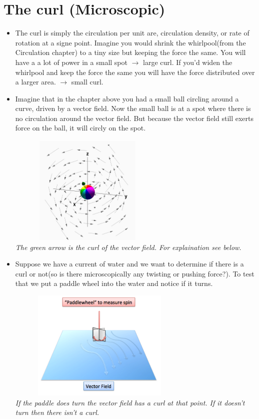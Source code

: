 \documentclass[12pt,a4paper]{article}
\begin{document}
	\newpage
	
	\section{The curl (Microscopic)}
	\begin{itemize}
		
		\item The curl is simply the circulation per unit are, circulation density, or rate of rotation at a signe point. Imagine you would shrink the whirlpool(from the Circulation chapter) to a tiny size but keeping the force the same. You will have a a lot of power in a small spot $\rightarrow$ large curl. If you'd widen the whirlpool and keep the force the same you will have the force distributed over a larger area. $\rightarrow$ small curl. 
		
		\item Imagine that in the chapter above you had a small ball circling around a curve, driven by a vector field. Now the small ball is at a spot where there is no circulation around the vector field. But because the vector field still exerts force on the ball, it will circly on the spot. 
		
		\includegraphics[width=0.6\textwidth, height = 200px]{curl.png}\\
		\textit{The green arrow is the curl of the vector field. For explaination see below.}
		
		\item Suppose we have a current of water and we want to determine if there is a curl or not(so is there microscopically any twisting or pushing force?). To test that we put a paddle wheel into the water and notice if it turns. 
		
		\includegraphics[width=0.7\textwidth, height = 200px]{paddle_wheel.png}\\
		\textit{If the paddle does turn the vector field has a curl at
		 that point. If it doesn't turn then there isn't a curl.}
		

\end{itemize}
\end{document}
